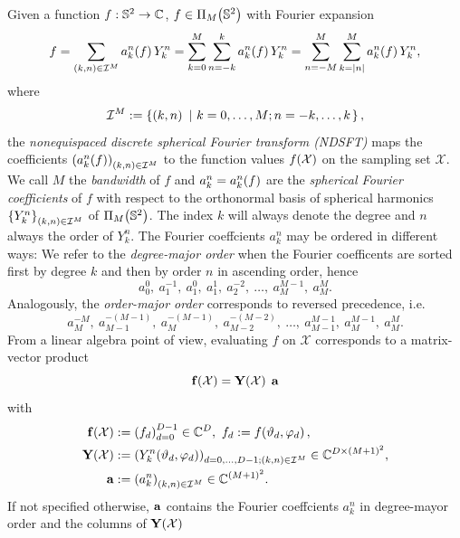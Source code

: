 Given a function $f: \mathbb{S}^2 \rightarrow \mathbb{C}$, $f \in \Pi_{M}{\hspace{-0.4ex}}\left(\mathbb{S}^2\right)$ with Fourier expansion
\begin{equation}
  \label{NFSFT:FourierExpansion} 
  f = \sum_{\left(k,n\right) \in\mathcal{I}^M} a_k^n{\hspace{-0.4ex}}\left(f\right) Y_{k}^n = \sum_{k=0}^M \sum_{n=-k}^k a_k^n{\hspace{-0.4ex}}\left(f\right) Y_{k}^n = \sum_{n=-M}^M \sum_{k=\left\vert n\right\vert}^M a_k^n{\hspace{-0.4ex}}\left(f\right) Y_{k}^n,
\end{equation}  
where 
\[\mathcal{I}^M := \left\{\left(k,n\right)\ \left|\ k=0,\ldots,M;n=-k,\ldots,k\right.\right\rbrace,\]
the \emph{nonequispaced discrete spherical Fourier transform (NDSFT)} maps the coefficients $\left(a_k^n{\hspace{-0.4ex}}\left(f\right)\right)_{(k,n) \in \mathcal{I}^M}$ to the function values $f{\hspace{-0.4ex}}\left(\mathcal{X}\right)$ on the sampling set $\mathcal{X}$.
We call $M$ the \emph{bandwidth} of $f$ and $a_{k}^n = a_{k}^n{\hspace{-0.4ex}}\left(f\right)$ are the \emph{spherical Fourier coefficients} of $f$ with respect to the 
orthonormal basis of spherical harmonics $\left\{Y_{k}^n\right\rbrace_{\left(k,n\right) \in\mathcal{I}^M}$ of $\Pi_{M}{\hspace{-0.4ex}}\left(\mathbb{S}^2\right)$. The index $k$ will always denote the degree and $n$ always the order of $Y_{k}^n$. The Fourier coeffcients $a_{k}^n$ may be ordered 
in different ways: We refer to the \emph{degree-major order} when the Fourier coefficents are sorted first by degree $k$ and then by order $n$ in ascending order, hence
\[ a_{0}^0,\: a_{1}^{-1},\: a_{1}^{0},\: a_{1}^{1},\: a_{2}^{-2},\: \ldots,\: a_{M}^{M-1},\: a_{M}^{M}.\] 
Analogously, the \emph{order-major order} corresponds to reversed precedence, i.e.
\[ a_{M}^{-M},\: a_{M-1}^{-(M-1)},\: a_{M}^{-(M-1)},\: a_{M-2}^{-(M-2)},\: \ldots,\: a_{M-1}^{M-1},\: a_{M}^{M-1},\: a_{M}^{M}.\] 
From a linear algebra point of view, evaluating $f$ on $\mathcal{X}$ corresponds to a matrix-vector product
\[ \mathbf{f}{\hspace{-0.4ex}}\left(\mathcal{X}\right) = \mathbf{Y}{\hspace{-0.4ex}}\left(\mathcal{X}\right) \; \mathbf{a}\]
with
\begin{equation}
  \nonumber
  \begin{split}
    \mathbf{f}{\hspace{-0.4ex}}\left(\mathcal{X}\right) & := \left(f_d\right)_{d=0}^{D-1} \in \mathbb{C}^{D},\ f_{d} := f{\hspace{-0.4ex}}\left(\vartheta_{d},\varphi_{d}\right),\\
    \mathbf{Y}{\hspace{-0.4ex}}\left(\mathcal{X}\right) & := \left(Y_k^n{\hspace{-0.4ex}}\left(\vartheta_d,\varphi_d\right)\right)_{d=0,\ldots,D-1; \left(k,n\right) \in \mathcal{I}^M} \in \mathbb{C}^{D \times \left(M+1\right)^2},\\
    \mathbf{a} & := \left(a_k^n\right)_{\left(k,n\right) \in \mathcal{I}^M} \in \mathbb{C}^{\left(M+1\right)^2}.
  \end{split}
\end{equation}
If not specified otherwise, $\mathbf{a}$ contains the Fourier coeffcients $a_{k}^n$ in degree-mayor order and the columns of $\mathbf{Y}{\hspace{-0.4ex}}\left(\mathcal{X}\right)$ 
